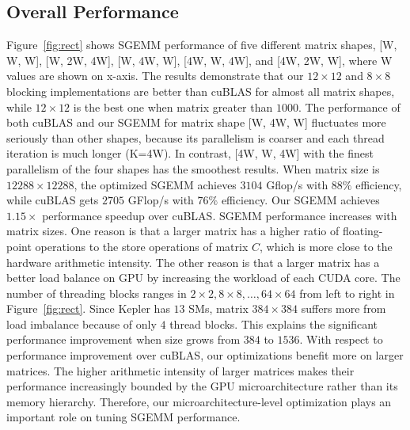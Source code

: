 \subsection{Overall Performance}
Figure~\ref{fig:rect} shows SGEMM performance of five different matrix shapes, [W, W, W], [W, 2W, 4W], [W, 4W, W], [4W, W, 4W], and [4W, 2W, W], where W values are shown on x-axis.
The results demonstrate that our $12\times12$ and $8\times8$ blocking implementations are better than cuBLAS for almost all matrix shapes, while $12\times12$ is the best one when matrix greater than $1000$.
The performance of both cuBLAS and our SGEMM for matrix shape [W, 4W, W] fluctuates more seriously than other shapes, because its parallelism is coarser and each thread iteration is much longer (K=4W).
In contrast, [4W, W, 4W] with the finest parallelism of the four shapes has the smoothest results.
When matrix size is $12288\times12288$, the optimized SGEMM achieves $3104$
Gflop/s with $88\%$ efficiency, while cuBLAS gets $2705$ GFlop/s with $76\%$ efficiency.
Our SGEMM achieves $1.15 \times$ performance speedup over cuBLAS.%
SGEMM performance increases with matrix sizes. 
One reason is that a larger matrix has a higher ratio of 
floating-point operations to the store operations of matrix $C$, which is more close to the hardware arithmetic intensity. 
The other reason is that a larger matrix has a better load balance on GPU by increasing the workload of each CUDA core.
The number of threading blocks ranges in $2 \times 2, 8 \times 8, \dots, 64 \times 64$ from left to right in Figure~\ref{fig:rect}.
Since Kepler has $13$ SMs, matrix $384\times 384$ suffers more from load imbalance because of only $4$ thread blocks.
This explains the significant performance improvement when size grows from $384$ to $1536$. 
With respect to performance improvement over cuBLAS, our optimizations benefit more on larger matrices. 
The higher arithmetic intensity of larger matrices makes their performance increasingly bounded by the GPU microarchitecture rather than its memory hierarchy. 
Therefore, our microarchitecture-level optimization plays an important role on tuning SGEMM
performance.

